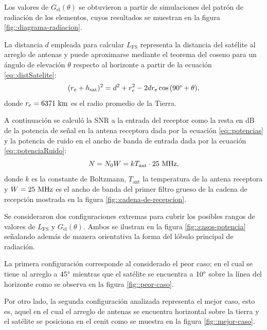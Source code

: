\documentclass[../../main.tex]{subfiles}
\begin{document}
Los valores de $G_\textrm{el} (\theta)$ se obtuvieron a partir de simulaciones del patrón de radiación de los elementos, cuyos resultados se muestran en la figura \ref{fig::diagrama-radiacion}.

La distancia $d$ empleada para calcular $L_\textrm{FS}$ representa la distancia del satélite al arreglo de antenas y puede aproximarse mediante el teorema del coseno para un ángulo de elevación $\theta$ respecto al horizonte a partir de la ecuación \ref{eq::distSatelite}:
\begin{equation}
    (r_e + h_\textrm{sat})^2 = d^2 + r_e^2 - 2 d r_e \cos{(90\degree + \theta)},
    \label{eq::distSatelite}
\end{equation}
donde $r_e = 6371~\textrm{km}$ es el radio promedio de la Tierra.

A continuación se calculó la SNR a la entrada del receptor como la resta en dB de la potencia de señal en la antena receptora dada por la ecuación \ref{eq::potencias} y la potencia de ruido en el ancho de banda de entrada dada por la ecuación \ref{eq::potenciaRuido}:
\begin{equation}
    N = N_0 W = k T_\textrm{ant} \cdot 25~\textrm{MHz},
    \label{eq::potenciaRuido}
\end{equation} 
donde $k$ es la constante de Boltzmann, $T_\textrm{ant}$ la temperatura de la antena receptora y $W = 25~\textrm{MHz}$ es el ancho de banda del primer filtro grueso de la cadena de recepción mostrada en la figura \ref{fig::cadena-de-recepcion}.

Se consideraron dos configuraciones extremas para cubrir los posibles rangos de valores de $L_\textrm{FS}$ y $G_\textrm{el}(\theta)$. Ambos se ilustran en la figura \ref{fig::casos-potencia} señalando además de manera orientativa la forma del lóbulo principal de radiación.

La primera configuración corresponde al considerado el peor caso; en el cual se tiene al arreglo a $45\degree$ mientras que el satélite se encuentra a $10\degree$ sobre la línea del horizonte como se observa en la figura \ref{fig::peor-caso}.

Por otro lado, la segunda configuración analizada representa el mejor caso, esto es, aquel en el cual el arreglo de antenas se encuentra horizontal sobre la tierra y el satélite se posiciona en el cenit como se muestra en la figura \ref{fig::mejor-caso}.
\end{document}
